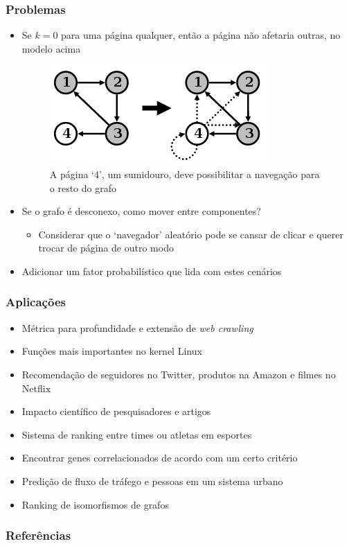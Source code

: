 \documentclass{beamer}
\begin{document}
\begin{frame}
    \frametitle{Problemas}
    \begin{itemize}
        \item Se $k = 0$ para uma página qualquer,
            então a página não afetaria outras, no modelo acima
        \begin{figure}
            \includegraphics[scale=0.35]{pr_2}
            \caption{\tiny{A página `4', um sumidouro, deve possibilitar a
                navegação para o resto do grafo}}
        \end{figure}
        \item Se o grafo é desconexo, como mover entre componentes?
        \begin{itemize}
            \item Considerar que o `navegador' aleatório pode se cansar de
                clicar e querer trocar de página de outro modo
        \end{itemize}
        \item Adicionar um fator probabilístico que lida com estes cenários
    \end{itemize}
\end{frame}

\begin{frame}
    \frametitle{Aplicações}
    \begin{itemize}
        \item Métrica para profundidade e extensão de \textit{web crawling}
        \item Funções mais importantes no kernel Linux
        \item Recomendação de seguidores no Twitter, produtos na Amazon e
            filmes no Netflix
        \item Impacto científico de pesquisadores e artigos
        \item Sistema de ranking entre times ou atletas em esportes
        \item Encontrar genes correlacionados de acordo com um certo critério
        \item Predição de fluxo de tráfego e pessoas em um sistema urbano
        \item Ranking de isomorfismos de grafos
    \end{itemize}
\end{frame}

\begin{frame}
    \frametitle{Referências}
    \nocite{*}
    
    
\end{frame}
\end{document}
